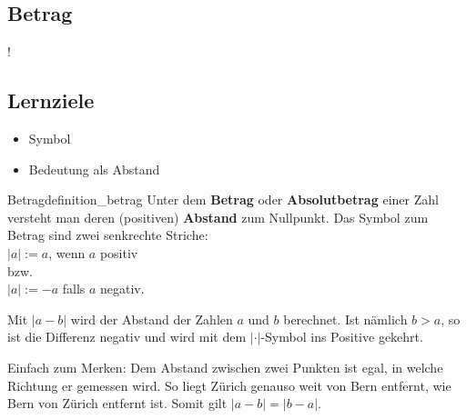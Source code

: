 
\subsection{Betrag}

!

%
\subsection*{Lernziele}

\begin{itemize}
  \item Symbol
  \item Bedeutung als Abstand
\end{itemize}



\newpage
\begin{definition}{Betrag}{definition_betrag}
  Unter dem \textbf{Betrag} oder \textbf{Absolutbetrag} einer Zahl versteht man deren (positiven)
  \textbf{Abstand} zum Nullpunkt. Das Symbol zum Betrag sind zwei
  senkrechte Striche:\\
  $|a| := a$, wenn $a$ positiv\\
  bzw.\\
  $|a| := -a$ falls $a$ negativ.
\end{definition}

\begin{bemerkung}{}{}
Mit $|a - b|$ wird der Abstand der Zahlen $a$ und $b$ berechnet. Ist
nämlich $b > a$, so ist die Differenz negativ und wird mit dem
$| \cdot{} |$-Symbol ins Positive gekehrt.
\end{bemerkung}

\begin{bemerkung}{}{}
  Einfach zum Merken: Dem Abstand zwischen zwei Punkten ist egal, in
  welche Richtung er gemessen wird. So liegt Zürich genauso weit von
  Bern entfernt, wie Bern von Zürich entfernt ist. Somit gilt $|a - b| = |b - a|$.
\end{bemerkung}

